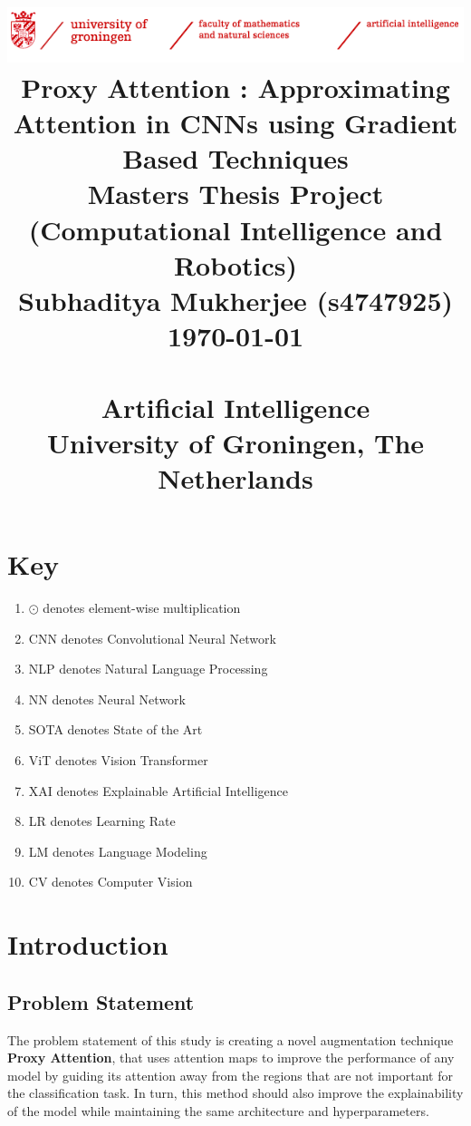 \documentclass[a4paper,11pt,openright]{book}
\title{
    \centering\includegraphics[width=\textwidth]{images/banner.png}
    \vspace{5mm}
        {\bf
        {\Huge Proxy Attention : Approximating Attention in CNNs using Gradient Based Techniques\\
        }
        }
        \vspace{4mm}Masters Thesis Project\\(Computational Intelligence and Robotics)\\
        \vspace{4mm}Subhaditya Mukherjee (s4747925)\\ \today \\
        \vspace{5cm}{\LARGE Internal Supervisor: S.H. Mohades Kasaei, PhD\\ Second Internal Supervisor: Matias Valdenegro, PhD}\\
        {\bf {Artificial Intelligence\\University of Groningen, The Netherlands}}
}
\date{}
\begin{document}
\maketitle


\tableofcontents

\listoffigures

\listoftables


% 
% 
% 
% 
%
%
%
%


\chapter*{Key}

\begin{enumerate}
    \item $\odot$ denotes element-wise multiplication
    \item CNN denotes Convolutional Neural Network
    \item NLP denotes Natural Language Processing
    \item NN denotes Neural Network
    \item SOTA denotes State of the Art
    \item ViT denotes Vision Transformer
    \item XAI denotes Explainable Artificial Intelligence
    \item LR denotes Learning Rate
    \item LM denotes Language Modeling
    \item CV denotes Computer Vision
\end{enumerate}

\chapter{Introduction}

\section{Problem Statement}
The problem statement of this study is creating a novel augmentation technique \textbf{Proxy Attention}, that uses attention maps to improve the performance of any model by guiding its attention away from the regions that are not important for the classification task.
In turn, this method should also improve the explainability of the model while maintaining the same architecture and hyperparameters.
\end{document}
